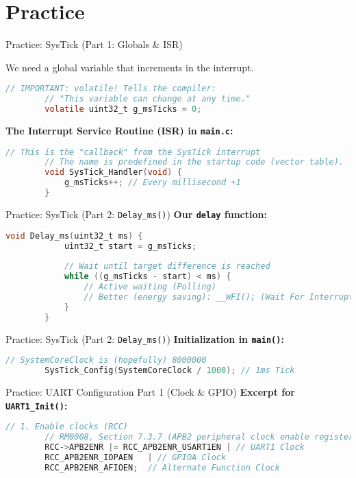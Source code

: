 \documentclass{beamer}
\begin{document}
\section{Practice}

\begin{frame}[fragile]{Practice: SysTick (Part 1: Globals \& ISR)}
	
	We need a global variable that increments in the interrupt.
	\begin{lstlisting}[language=C, style=mystyle]
		// IMPORTANT: volatile! Tells the compiler:
		// "This variable can change at any time."
		volatile uint32_t g_msTicks = 0;
	\end{lstlisting}
	
	\textbf{The Interrupt Service Routine (ISR) in \texttt{main.c}:}
	\begin{lstlisting}[language=C, style=mystyle]
		// This is the "callback" from the SysTick interrupt
		// The name is predefined in the startup code (vector table).
		void SysTick_Handler(void) {
			g_msTicks++; // Every millisecond +1
		}
	\end{lstlisting}
\end{frame}

\begin{frame}[fragile]{Practice: SysTick (Part 2: \texttt{Delay\_ms()})}
	\textbf{Our \texttt{delay} function:}
	\begin{lstlisting}[language=C, style=mystyle]
		void Delay_ms(uint32_t ms) {
			uint32_t start = g_msTicks;
			
			// Wait until target difference is reached
			while ((g_msTicks - start) < ms) {
				// Active waiting (Polling)
				// Better (energy saving): __WFI(); (Wait For Interrupt)
			}
		}
	\end{lstlisting}
\end{frame}

\begin{frame}[fragile]{Practice: SysTick (Part 2: \texttt{Delay\_ms()})}
	\textbf{Initialization in \texttt{main()}:}
	\begin{lstlisting}[language=C, style=mystyle]
		// SystemCoreClock is (hopefully) 8000000
		SysTick_Config(SystemCoreClock / 1000); // 1ms Tick
	\end{lstlisting}
\end{frame}

\begin{frame}[fragile]{Practice: UART Configuration Part 1 (Clock \& GPIO)}
	\textbf{Excerpt for \texttt{UART1\_Init()}:}
	
	\begin{lstlisting}[language=C, style=mystyle]
		// 1. Enable clocks (RCC)
		// RM0008, Section 7.3.7 (APB2 peripheral clock enable register)
		RCC->APB2ENR |= RCC_APB2ENR_USART1EN | // UART1 Clock
		RCC_APB2ENR_IOPAEN   | // GPIOA Clock
		RCC_APB2ENR_AFIOEN;  // Alternate Function Clock
	\end{lstlisting}
\end{frame}
\end{document}
